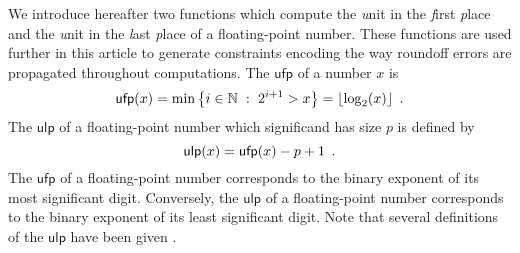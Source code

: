 We introduce hereafter two functions which compute the  \textit{u}nit in the \textit{f}irst \textit{p}lace
and  the \textit{u}nit in the \textit{l}ast \textit{p}lace
of a floating-point number. These functions are used further in this article to generate constraints encoding the way
roundoff errors are propagated throughout computations.
The $\mathsf{ufp}$ of a number $x$ is 
\begin{equation}\small\label{equfp}
\mathsf{ufp}(x) = \min \big\{ i\in \mathbb{N}\ :\ 2^{i+1} > x\big\} = \lfloor \log_2(x)\rfloor\enspace.
\end{equation}
The $\mathsf{ulp}$ of a floating-point number which significand has size $p$ is defined by
\begin{equation}\small
 \mathsf{ulp}(x) = \mathsf{ufp}(x) - p+1\enspace .
\end{equation}
The $\mathsf{ufp}$ of a floating-point number corresponds to the binary exponent of its most significant digit.
Conversely, the $\mathsf{ulp}$ of a floating-point number corresponds to the binary exponent of its least significant digit.
Note that several definitions of the $\mathsf{ulp}$ have been given \cite{Mul05}.

